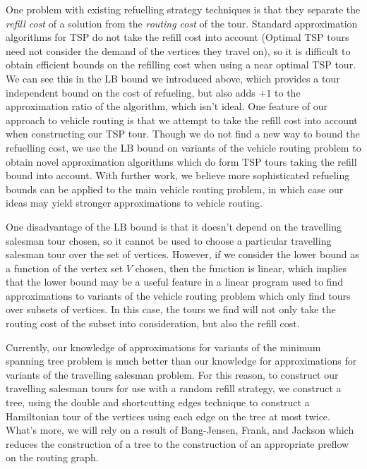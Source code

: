 \documentclass{article}
\theoremstyle{plain}
\theoremstyle{plain}
\begin{document}
One problem with existing refuelling strategy techniques is that they separate the {\it refill cost} of a solution from the {\it routing cost} of the tour. Standard approximation algorithms for TSP do not take the refill cost into account (Optimal TSP tours need not consider the demand of the vertices they travel on), so it is difficult to obtain efficient bounds on the refilling cost when using a near optimal TSP tour. We can see this in the $\text{LB}$ bound we introduced above, which provides a tour independent bound on the cost of refueling, but also adds $+1$ to the approximation ratio of the algorithm, which isn't ideal. One feature of our approach to vehicle routing is that we attempt to take the refill cost into account when constructing our TSP tour. Though we do not find a new way to bound the refuelling cost, we use the $\text{LB}$ bound on variants of the vehicle routing problem to obtain novel approximation algorithms which do form TSP tours taking the refill bound into account. With further work, we believe more sophisticated refueling bounds can be applied to the main vehicle routing problem, in which case our ideas may yield stronger approximations to vehicle routing.

One disadvantage of the $\text{LB}$ bound is that it doesn't depend on the travelling salesman tour chosen, so it cannot be used to choose a particular travelling salesman tour over the set of vertices. However, if we consider the lower bound as a function of the vertex set $V$ chosen, then the function is linear, which implies that the lower bound may be a useful feature in a linear program used to find approximations to variants of the vehicle routing problem which only find tours over subsets of vertices. In this case, the tours we find will not only take the routing cost of the subset into consideration, but also the refill cost.

Currently, our knowledge of approximations for variants of the minimum spanning tree problem is much better than our knowledge for approximations for variants of the travelling salesman problem. For this reason, to construct our travelling salesman tours for use with a random refill strategy, we construct a tree, using the double and shortcutting edges technique to construct a Hamiltonian tour of the vertices using each edge on the tree at most twice. What's more, we will rely on a result of Bang-Jensen, Frank, and Jackson which reduces the construction of a tree to the construction of an appropriate preflow on the routing graph.
\end{document}

